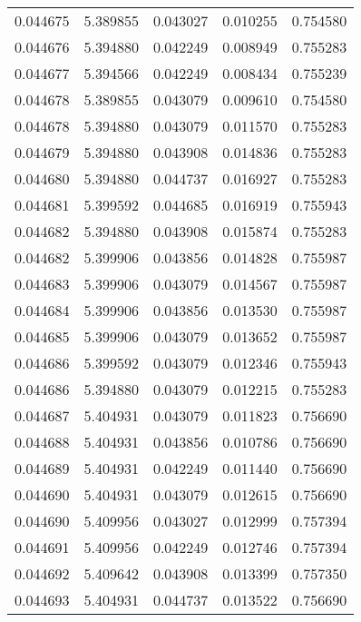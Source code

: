 \begin{tabular}{lrrrr}
0.044675    &  5.389855 &  0.043027 &  0.010255 &             0.754580 \\
0.044676    &  5.394880 &  0.042249 &  0.008949 &             0.755283 \\
0.044677    &  5.394566 &  0.042249 &  0.008434 &             0.755239 \\
0.044678    &  5.389855 &  0.043079 &  0.009610 &             0.754580 \\
0.044678    &  5.394880 &  0.043079 &  0.011570 &             0.755283 \\
0.044679    &  5.394880 &  0.043908 &  0.014836 &             0.755283 \\
0.044680    &  5.394880 &  0.044737 &  0.016927 &             0.755283 \\
0.044681    &  5.399592 &  0.044685 &  0.016919 &             0.755943 \\
0.044682    &  5.394880 &  0.043908 &  0.015874 &             0.755283 \\
0.044682    &  5.399906 &  0.043856 &  0.014828 &             0.755987 \\
0.044683    &  5.399906 &  0.043079 &  0.014567 &             0.755987 \\
0.044684    &  5.399906 &  0.043856 &  0.013530 &             0.755987 \\
0.044685    &  5.399906 &  0.043079 &  0.013652 &             0.755987 \\
0.044686    &  5.399592 &  0.043079 &  0.012346 &             0.755943 \\
0.044686    &  5.394880 &  0.043079 &  0.012215 &             0.755283 \\
0.044687    &  5.404931 &  0.043079 &  0.011823 &             0.756690 \\
0.044688    &  5.404931 &  0.043856 &  0.010786 &             0.756690 \\
0.044689    &  5.404931 &  0.042249 &  0.011440 &             0.756690 \\
0.044690    &  5.404931 &  0.043079 &  0.012615 &             0.756690 \\
0.044690    &  5.409956 &  0.043027 &  0.012999 &             0.757394 \\
0.044691    &  5.409956 &  0.042249 &  0.012746 &             0.757394 \\
0.044692    &  5.409642 &  0.043908 &  0.013399 &             0.757350 \\
0.044693    &  5.404931 &  0.044737 &  0.013522 &             0.756690 \\

\end{tabular}
